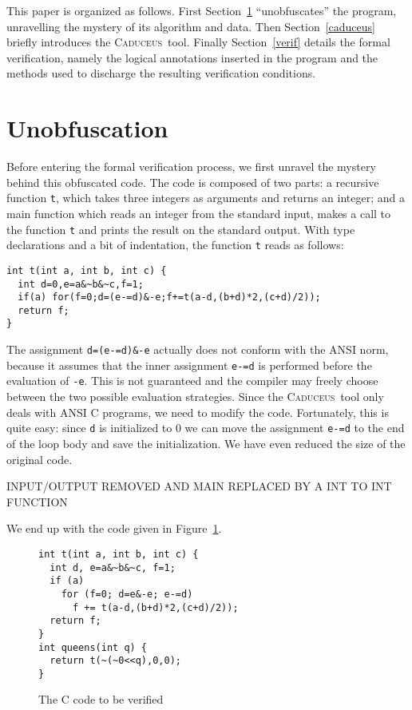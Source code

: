 \documentclass[a4paper]{llncs}
\newcommand{\caduceus}{\textsc{Caduceus}}
\begin{document}
This paper is organized as follows. First Section~\ref{unobf}
``unobfuscates'' the program, unravelling the mystery of its algorithm
and data. Then Section~\ref{caduceus} briefly introduces the \caduceus\
tool. Finally Section~\ref{verif} details the formal verification,
namely the logical annotations inserted in the program
and the methods used to discharge the resulting verification conditions.

\section{Unobfuscation}\label{unobf}

Before entering the formal verification process, we first unravel the
mystery behind this obfuscated code. The code is composed of two
parts: a recursive function \texttt{t}, which takes three integers as
arguments and returns an integer; and a main function which reads an
integer from the standard input, makes a call to the function
\texttt{t} and prints the result on the standard output.
With type declarations and a bit of indentation, the function
\texttt{t} reads as follows:
\begin{verbatim}
int t(int a, int b, int c) {
  int d=0,e=a&~b&~c,f=1;
  if(a) for(f=0;d=(e-=d)&-e;f+=t(a-d,(b+d)*2,(c+d)/2));
  return f;
}
\end{verbatim}
The assignment \verb!d=(e-=d)&-e! actually does not conform with the
ANSI norm, because it assumes that the inner assignment \verb!e-=d! is
performed before the evaluation of \verb!-e!. This is not guaranteed
and the compiler may freely choose between the two possible evaluation
strategies. Since the \caduceus\ tool only deals with ANSI C programs,
we need to modify the code. Fortunately, this is quite easy:
since \verb!d! is initialized to 0 we can move the
assignment \verb!e-=d! to the end of the loop body and save the
initialization. We have even reduced the size of the original code.



INPUT/OUTPUT REMOVED AND MAIN REPLACED BY A INT TO INT FUNCTION

We end up with the code given in Figure~\ref{fig:code}.
\begin{figure}[t]
  \centering\hrulefill\vspace{-1em}
\begin{verbatim}
int t(int a, int b, int c) {
  int d, e=a&~b&~c, f=1;
  if (a)
    for (f=0; d=e&-e; e-=d)
      f += t(a-d,(b+d)*2,(c+d)/2));
  return f;
}
int queens(int q) {
  return t(~(~0<<q),0,0);
}
\end{verbatim}  
\vspace{-1.2em}\hrulefill\vspace{-1em}
  \caption{The C code to be verified}
  \label{fig:code}
\end{figure}
\end{document}
